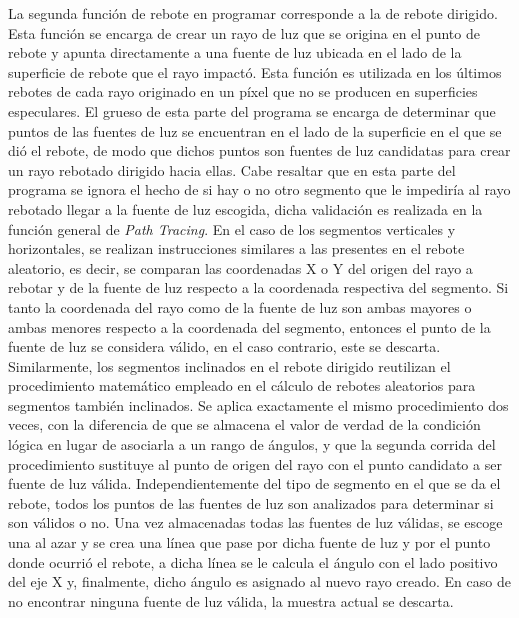 \documentclass[conference]{IEEEtran}
\begin{document}
La segunda función de rebote en programar corresponde a la de rebote dirigido. Esta función se encarga de crear un rayo de luz que se origina en el punto de rebote y apunta directamente a una fuente de luz ubicada en el lado de la superficie de rebote que el rayo impactó. Esta función es utilizada en los últimos rebotes de cada rayo originado en un píxel que no se producen en superficies especulares. El grueso de esta parte del programa se encarga de determinar que puntos de las fuentes de luz se encuentran en el lado de la superficie en el que se dió el rebote, de modo que dichos puntos son fuentes de luz candidatas para crear un rayo rebotado dirigido hacia ellas. Cabe resaltar que en esta parte del programa se ignora el hecho de si hay o no otro segmento que le impediría al rayo rebotado llegar a la fuente de luz escogida, dicha validación es realizada en la función general de \textit{Path Tracing}. En el caso de los segmentos verticales y horizontales, se realizan instrucciones similares a las presentes en el rebote aleatorio, es decir, se comparan las coordenadas X o Y del origen del rayo a rebotar y de la fuente de luz respecto a la coordenada respectiva del segmento. Si tanto la coordenada del rayo como de la fuente de luz son ambas mayores o ambas menores respecto a la coordenada del segmento, entonces el punto de la fuente de luz se considera válido, en el caso contrario, este se descarta. Similarmente, los segmentos inclinados en el rebote dirigido reutilizan el procedimiento matemático empleado en el cálculo de rebotes aleatorios para segmentos también inclinados. Se aplica exactamente el mismo procedimiento dos veces, con la diferencia de que se almacena el valor de verdad de la condición lógica en lugar de asociarla a un rango de ángulos, y que la segunda corrida del procedimiento sustituye al punto de origen del rayo con el punto candidato a ser fuente de luz válida. Independientemente del tipo de segmento en el que se da el rebote, todos los puntos de las fuentes de luz son analizados para determinar si son válidos o no. Una vez almacenadas todas las fuentes de luz válidas, se escoge una al azar y se crea una línea que pase por dicha fuente de luz y por el punto donde ocurrió el rebote, a dicha línea se le calcula el ángulo con el lado positivo del eje X y, finalmente, dicho ángulo es asignado al nuevo rayo creado. En caso de no encontrar ninguna fuente de luz válida, la muestra actual se descarta.
\end{document}
